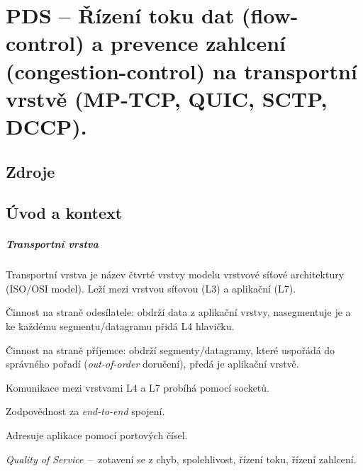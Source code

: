 

\graphicspath{{pds/rizeni_toku_a_prevence_zahlceni/figures}}


\chapter{PDS -- Řízení toku dat (flow-control) a prevence zahlcení (congestion-control) na transportní vrstvě (MP-TCP, QUIC, SCTP, DCCP).}


\section{Zdroje}

\begin{compactitem}
    \item {}
    \item {}
\end{compactitem}


\section{Úvod a kontext}

\paragraph*{Transportní vrstva} Transportní vrstva je název čtvrté vrstvy modelu vrstvové síťové architektury (ISO/OSI model). Leží mezi vrstvou síťovou (L3) a aplikační (L7). \begin{compactitem}
    \item Činnost na straně odesílatele: obdrží data z aplikační vrstvy, nasegmentuje je a ke každému segmentu/datagramu přidá L4 hlavičku.
    \item Činnost na straně příjemce: obdrží segmenty/datagramy, které uspořádá do správného pořadí (\textit{out-of-order} doručení), předá je aplikační vrstvě.
    \item Komunikace mezi vrstvami L4 a L7 probíhá pomocí socketů.
    \item Zodpovědnost za \textit{end-to-end} spojení.
    \item Adresuje aplikace pomocí portových čísel.
    \item \textit{Quality of Service}~--~zotavení se z chyb, spolehlivost, řízení toku, řízení zahlcení.
\end{compactitem}

